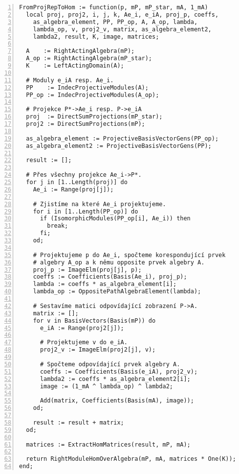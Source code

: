            
      \begin{Verbatim}[frame=single,numbers=left] 
FromProjRepToHom := function(p, mP, mP_star, mA, 1_mA)
  local proj, proj2, i, j, k, Ae_i, e_iA, proj_p, coeffs,
    as_algebra_element, PP, PP_op, A, A_op, lambda,
    lambda_op, v, proj2_v, matrix, as_algebra_element2,
    lambda2, result, K, image, matrices;

  A    := RightActingAlgebra(mP);
  A_op := RightActingAlgebra(mP_star);
  K    := LeftActingDomain(A);

  # Moduly e_iA resp. Ae_i.
  PP    := IndecProjectiveModules(A);
  PP_op := IndecProjectiveModules(A_op);

  # Projekce P*->Ae_i resp. P->e_iA
  proj  := DirectSumProjections(mP_star);
  proj2 := DirectSumProjections(mP);

  as_algebra_element := ProjectiveBasisVectorGens(PP_op);
  as_algebra_element2 := ProjectiveBasisVectorGens(PP);

  result := [];

  # Přes všechny projekce Ae_i->P*.
  for j in [1..Length(proj)] do
    Ae_i := Range(proj[j]);

    # Zjistíme na které Ae_i projektujeme.
    for i in [1..Length(PP_op)] do
      if (IsomorphicModules(PP_op[i], Ae_i)) then
        break;
      fi;
    od;

    # Projektujeme p do Ae_i, spočteme korespondující prvek
    # algebry A_op a k němu opposite prvek algebry A.
    proj_p := ImageElm(proj[j], p);
    coeffs := Coefficients(Basis(Ae_i), proj_p);
    lambda := coeffs * as_algebra_element[i];
    lambda_op := OppositePathAlgebraElement(lambda);

    # Sestavíme matici odpovídající zobrazení P->A.
    matrix := [];
    for v in BasisVectors(Basis(mP)) do
      e_iA := Range(proj2[j]);

      # Projektujeme v do e_iA.
      proj2_v := ImageElm(proj2[j], v);

      # Spočteme odpovídající prvek algebry A.
      coeffs := Coefficients(Basis(e_iA), proj2_v);
      lambda2 := coeffs * as_algebra_element2[i];
      image := (1_mA ^ lambda_op) ^ lambda2;

      Add(matrix, Coefficients(Basis(mA), image));
    od;

    result := result + matrix;
  od;

  matrices := ExtractHomMatrices(result, mP, mA);

  return RightModuleHomOverAlgebra(mP, mA, matrices * One(K));
end;      
\end{Verbatim}
    
